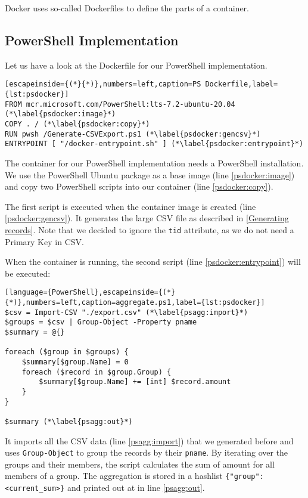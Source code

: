 Docker uses so-called Dockerfiles to define the parts of a container.

\subsection{PowerShell Implementation}

Let us have a look at the Dockerfile for our \gls{PowerShell} implementation.

\begin{lstlisting}[escapeinside={(*}{*)},numbers=left,caption=PS Dockerfile,label={lst:psdocker}]
FROM mcr.microsoft.com/PowerShell:lts-7.2-ubuntu-20.04 (*\label{psdocker:image}*)
COPY . / (*\label{psdocker:copy}*)
RUN pwsh /Generate-CSVExport.ps1 (*\label{psdocker:gencsv}*)
ENTRYPOINT [ "/docker-entrypoint.sh" ] (*\label{psdocker:entrypoint}*)
\end{lstlisting}
The container for our \gls{PowerShell} implementation needs
a \gls{PowerShell} installation. We use the \gls{PowerShell} Ubuntu package \cite{dockerPS}
as a base image (line \ref{psdocker:image})
and copy two \gls{PowerShell} scripts into our container (line \ref{psdocker:copy}).

The first script is executed when the container image is created
(line \ref{psdocker:gencsv}). It generates the large \gls{CSV}
file as described in \ref{Generating records}. Note that we
decided to ignore the \verb+tid+ attribute, as we do not
need a Primary Key in \gls{CSV}.

When the container is running, the second script
(line \ref{psdocker:entrypoint}) will be executed:

\begin{lstlisting}[language={PowerShell},escapeinside={(*}{*)},numbers=left,caption=aggregate.ps1,label={lst:psdocker}]
$csv = Import-CSV "./export.csv" (*\label{psagg:import}*)
$groups = $csv | Group-Object -Property pname
$summary = @{}

foreach ($group in $groups) {
    $summary[$group.Name] = 0
    foreach ($record in $group.Group) {
        $summary[$group.Name] += [int] $record.amount
    }
}

$summary (*\label{psagg:out}*)
\end{lstlisting}
It imports all the \gls{CSV} data (line \ref{psagg:import}) that we generated
before and uses \verb+Group-Object+ to group the records by their \verb+pname+.
By iterating over the groups and their members, the script calculates
the sum of amount for all members of a group. The
aggregation is stored in a hashlist
\verb+{"group": <current_sum>}+ and printed out at in line \ref{psagg:out}.

